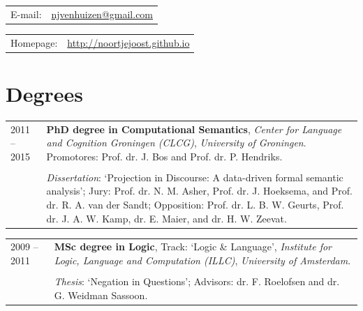 \documentclass[a4paper,10pt]{article}
\def\leftcolwidth{.12\textwidth}
\def\tablevspace{10pt}
\begin{document}
\vspace{\tablevspace}

\noindent
\begin{tabularx}{\textwidth}{ p{\leftcolwidth} X }
  E-mail:         
  &         \href{mailto:njvenhuizen@gmail.com}{njvenhuizen@gmail.com}\\
\end{tabularx}

\vspace{\tablevspace}

\noindent
\begin{tabularx}{\textwidth}{ p{\leftcolwidth} X }
  Homepage:    &       \url{http://noortjejoost.github.io}
\end{tabularx}



\section*{Degrees}

\noindent
\begin{tabularx}{\textwidth}{ p{\leftcolwidth} X }
  2011 -- 2015
  & \textbf{PhD degree in Computational Semantics}, 
    \textit{Center for Language and Cognition Groningen (CLCG)}, 
    \textit{University of Groningen}. Promotores: Prof. dr. J. Bos and Prof.
      dr. P. Hendriks.\\
  & \\
  & \textit{Dissertation}: `Projection in Discourse: A data-driven formal
      semantic analysis'; Jury: Prof. dr. N. M. Asher,
      Prof. dr. J. Hoeksema, and Prof. dr. R. A. van der Sandt; Opposition:
      Prof. dr. L. B. W. Geurts, Prof. dr. J. A. W. Kamp, dr. E. Maier, 
      and dr. H. W. Zeevat.
  \end{tabularx}

\vspace{\tablevspace}

\noindent
\begin{tabularx}{\textwidth}{ p{\leftcolwidth} X }
  2009 -- 2011  
  & \textbf{MSc degree in Logic}, Track: `Logic \& Language', 
    \textit{Institute for Logic, Language and Computation (ILLC)},
    \textit{University of Amsterdam}.\\
  & \\
  & \textit{Thesis}: `Negation in Questions'; Advisors: dr. F. Roelofsen and dr. G. Weidman Sassoon.
\end{tabularx}
\end{document}
